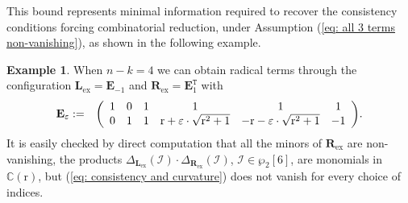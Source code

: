 \documentclass[10pt]{article}
\theoremstyle{remark}%
\theoremstyle{definition}%
\newtheorem{example}{Example}%
\begin{document}
This bound represents minimal information required to recover the consistency conditions forcing combinatorial reduction, under Assumption (\ref{eq: all 3 terms non-vanishing}), as shown in the following example. 
\begin{example}
\label{exa: counterexample limited information, dimensionality}
When $n-k=4$ we can obtain radical terms through the configuration $\mathbf{L}_{\text{ex}}=\mathbf{E}_{-1}$ and $\mathbf{R}_{\text{ex}}=\mathbf{E}_{1}^{\mathtt{T}}$ with  
\begin{eqnarray*}
\mathbf{E}_{\varepsilon} & := & 
{\small\left(\begin{array}{cccccc}
1 & 0 & 1 & 1 & 1 & 1\\
0 & 1 & 1 & \mathrm{r}+\varepsilon\cdot\sqrt{\mathrm{r}^{2}+1} & -\mathrm{r}-\varepsilon\cdot\sqrt{\mathrm{r}^{2}+1} & -1
\end{array}\right)}.
\end{eqnarray*}
It is easily checked by direct computation that all the minors of $\mathbf{R}_{\text{ex}}$ are non-vanishing, the products
$\Delta_{\mathbf{L}_{\text{ex}}}(\mathcal{I}) \cdot \Delta_{\mathbf{R}_{\text{ex}}}(\mathcal{I})$, $\mathcal{I}\in \wp_{2}[6]$, are monomials 
in $\mathbb{C}(\mathrm{r})$, but (\ref{eq: consistency and curvature}) does not vanish for every choice of indices.
\end{example}
\end{document}
